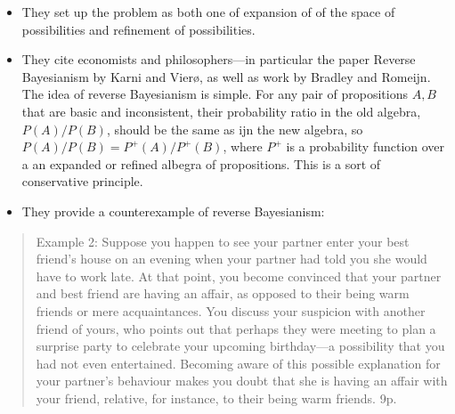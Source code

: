 \documentclass[
  11pt,
  dvipsnames,enabledeprecatedfontcommands]{scrartcl}
\begin{document}
\begin{itemize}
\item
  They set up the problem as both one of expansion of of the space of
  possibilities and refinement of possibilities.
\item
  They cite economists and philosophers---in particular the paper
  Reverse Bayesianism by Karni and Vierø, as well as work by Bradley and
  Romeijn. The idea of reverse Bayesianism is simple. For any pair of
  propositions \(A, B\) that are basic and inconsistent, their
  probability ratio in the old algebra,\(P(A)/P(B)\), should be the same
  as ijn the new algebra, so \(P(A)/P(B)=P^+(A)/P^+(B)\), where \(P^+\)
  is a probability function over a an expanded or refined albegra of
  propositions. This is a sort of conservative principle.
\item
  They provide a counterexample of reverse Bayesianism:
\end{itemize}

\begin{quote}
Example 2: Suppose you happen to see your partner enter your best
friend's house on an evening when your partner had told you she would
have to work late. At that point, you become convinced that your partner
and best friend are having an affair, as opposed to their being warm
friends or mere acquaintances. You discuss your suspicion with another
friend of yours, who points out that perhaps they were meeting to plan a
surprise party to celebrate your upcoming birthday---a possibility that
you had not even entertained. Becoming aware of this possible
explanation for your partner's behaviour makes you doubt that she is
having an affair with your friend, relative, for instance, to their
being warm friends. 9p.
\end{quote}
\end{document}
